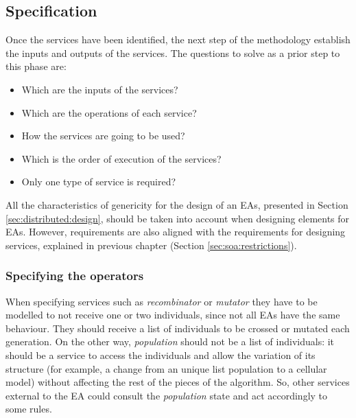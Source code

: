  

\subsection{Specification}

Once the services have been identified, the next step of the methodology establish the inputs and outputs of the services. The questions to solve as a prior step to this phase are:

\begin{itemize}
\item Which are the inputs of the services?
\item Which are the operations of each service?
\item How the services are going to be used?
\item Which is the order of execution of the services?
\item Only one type of service is required?
\end{itemize}


 All the characteristics of genericity for the design of an EAs, presented in Section \ref{sec:distributed:design}, should be taken into account when designing elements for EAs. However, requirements are also aligned with the requirements for designing services, explained in previous chapter (Section \ref{sec:soa:restrictions}).


\subsubsection{Specifying the operators}
When specifying services such as 
{\em recombinator} or {\em mutator} they have to be modelled to not receive one or two
individuals, since not all EAs have the same behaviour. They should receive a
list of individuals to be crossed or mutated each generation. On the other way,
{\em population} should not be a list of individuals: it should be a service
to access the individuals and allow the variation of its structure (for example, a change
from an unique list population to a cellular model) without
affecting  the rest of the pieces of the algorithm. So, other services
external to the EA could consult the {\em population} state and act
accordingly to some rules. 

